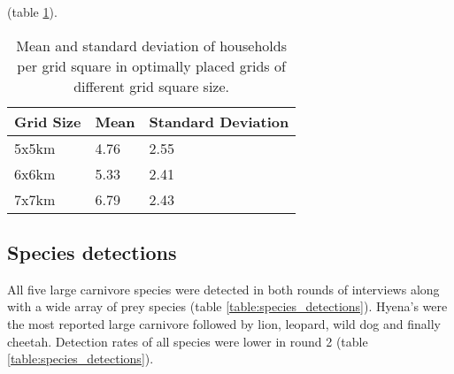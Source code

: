 (table \ref{table:grid_place}).
\begin{table}[htb]
	\small
	\begin{center}
		\begin{tabular}{l l l}
			\hline \hline		
			Grid Size	& Mean 	& Standard Deviation \\ \hline
			5x5km 		& 4.76	& 2.55	\\	
			6x6km		& 5.33	& 2.41	\\
			7x7km		& 6.79	& 2.43	\\
			\hline \hline						
		\end{tabular}
		\caption{Mean and standard deviation of households per grid square in optimally placed grids of different grid square size.}
	\label{table:grid_place}
	\end{center}
\end{table}


\subsection{Species detections}

All five large carnivore species were detected in both rounds of interviews along with a wide array of prey species (table \ref{table:species_detections}). Hyena's were the most reported large carnivore followed by lion, leopard, wild dog and finally cheetah. Detection rates of all species were lower in round 2 (table \ref{table:species_detections}).

